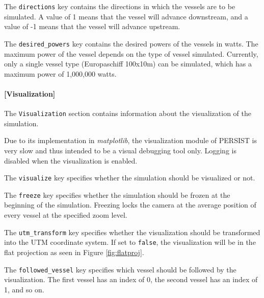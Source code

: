 \documentclass[
	a4paper, %
	12pt, %
]{persist}
\begin{document}
The \verb|directions| key contains the directions in which the vessels are to be simulated. A value of 1 means that the vessel will advance downstream, and a value of -1 means that the vessel will advance upstream. 


The \verb|desired_powers| key contains the desired powers of the vessels in watts. The maximum power of the vessel depends on the type of vessel simulated. Currently, only a single vessel type (Europaschiff 100x10m) can be simulated, which has a maximum power of 1,000,000 watts. 

\paragraph{[Visualization]}

The \verb|Visualization| section contains information about the visualization of the simulation. 

\begin{note}
	Due to its implementation in \emph{matplotlib}, the visualization module of PERSIST is very slow and thus intended to be a visual debugging tool only. Logging is disabled when the visualization is enabled.
\end{note}

The \verb|visualize| key specifies whether the simulation should be visualized or not. 

The \verb|freeze| key specifies whether the simulation should be frozen at the beginning of the simulation. Freezing locks the camera at the average position of every vessel at the specified zoom level.

The \verb|utm_transform| key specifies whether the visualization should be transformed into the UTM coordinate system. If set to \verb|false|, the visualization will be in the flat projection as seen in Figure \ref{fig:flatproj}.

The \verb|followed_vessel| key specifies which vessel should be followed by the visualization. The first vessel has an index of 0, the second vessel has an index of 1, and so on. 
\end{document}
